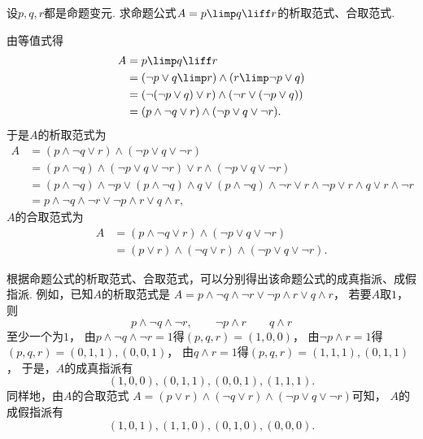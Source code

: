 \begin{example}
设\(p,q,r\)都是命题变元.
求命题公式\(A = p \limp q \liff r\)的析取范式、合取范式.
\begin{solution}
由等值式得\begin{align*}
	A &= p \limp q \liff r \\
	&= (\neg p \lor q \limp r) \land (r \limp \neg p \lor q) \\
	&= (\neg(\neg p \lor q) \lor r) \land (\neg r \lor (\neg p \lor q)) \\
	&= (p \land \neg q \lor r) \land (\neg p \lor q \lor \neg r).
\end{align*}
于是\(A\)的析取范式为\begin{align*}
	A &= (p \land \neg q \lor r) \land (\neg p \lor q \lor \neg r) \\
	&= (p \land \neg q) \land (\neg p \lor q \lor \neg r)
		\lor r \land (\neg p \lor q \lor \neg r) \\
	&= (p \land \neg q) \land \neg p
		\lor (p \land \neg q) \land q
		\lor (p \land \neg q) \land \neg r
		\lor r \land \neg p
		\lor r \land q
		\lor r \land \neg r \\
	&= p \land \neg q \land \neg r
		\lor \neg p \land r
		\lor q \land r,
\end{align*}
\(A\)的合取范式为\begin{align*}
	A &= (p \land \neg q \lor r) \land (\neg p \lor q \lor \neg r) \\
	&= (p \lor r) \land (\neg q \lor r) \land (\neg p \lor q \lor \neg r).
\end{align*}
\end{solution}
\end{example}

根据命题公式的析取范式、合取范式，可以分别得出该命题公式的成真指派、成假指派.
例如，已知\(A\)的析取范式是
\(A = p \land \neg q \land \neg r
\lor \neg p \land r
\lor q \land r\)，
若要\(A\)取\(1\)，
则\begin{equation*}
	p \land \neg q \land \neg r,
	\qquad
	\neg p \land r
	\qquad
	q \land r
\end{equation*}至少一个为\(1\)，
由\(p \land \neg q \land \neg r = 1\)得\((p,q,r) = (1,0,0)\)，
由\(\neg p \land r = 1\)得\((p,q,r) = (0,1,1),(0,0,1)\)，
由\(q \land r = 1\)得\((p,q,r) = (1,1,1),(0,1,1)\)，
于是，\(A\)的成真指派有\begin{equation*}
	(1,0,0),
	(0,1,1),
	(0,0,1),
	(1,1,1).
\end{equation*}
同样地，由\(A\)的合取范式
\(A = (p \lor r) \land (\neg q \lor r) \land (\neg p \lor q \lor \neg r)\)可知，
\(A\)的成假指派有\begin{equation*}
	(1,0,1),
	(1,1,0),
	(0,1,0),
	(0,0,0).
\end{equation*}

